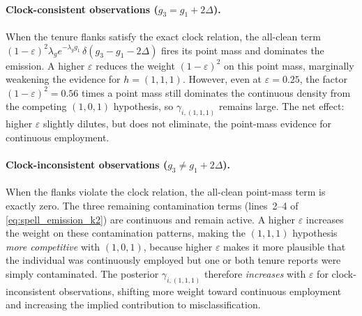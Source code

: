\documentclass[12pt]{article}
\begin{document}
\paragraph{Clock-consistent observations (\(g_3 = g_1 + 2\Delta\)).}
When the tenure flanks satisfy the exact clock relation, the all-clean
term \((1-\varepsilon)^2 \lambda_g e^{-\lambda_g g_1}\, \delta(g_3 - g_1 - 2\Delta)\)
fires its point mass and dominates the emission. A higher \(\varepsilon\)
reduces the weight \((1-\varepsilon)^2\) on this point mass, marginally
weakening the evidence for \(h = (1,1,1)\). However, even at
\(\varepsilon = 0.25\), the factor \((1-\varepsilon)^2 = 0.56\) times a
point mass still dominates the continuous density from the competing
\((1,0,1)\) hypothesis, so \(\gamma_{i,(1,1,1)}\) remains large. The
net effect: higher \(\varepsilon\) slightly dilutes, but does not
eliminate, the point-mass evidence for continuous employment.

\paragraph{Clock-inconsistent observations (\(g_3 \neq g_1 + 2\Delta\)).}
When the flanks violate the clock relation, the all-clean point-mass
term is exactly zero. The three remaining contamination terms
(lines~2--4 of \eqref{eq:spell_emission_k2}) are continuous and remain
active. A higher \(\varepsilon\) increases the weight on these
contamination patterns, making the \((1,1,1)\) hypothesis
\emph{more competitive} with \((1,0,1)\), because higher \(\varepsilon\)
makes it more plausible that the individual was continuously employed
but one or both tenure reports were simply contaminated. The posterior
\(\gamma_{i,(1,1,1)}\) therefore \emph{increases} with \(\varepsilon\)
for clock-inconsistent observations, shifting more weight toward
continuous employment and increasing the implied contribution to
misclassification.
\end{document}
